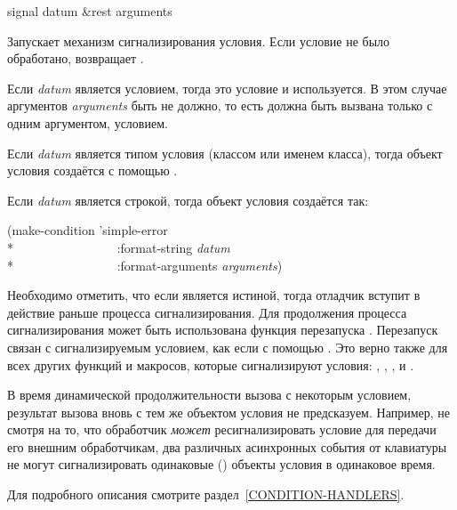 \begin{defun}[Функция]
signal datum &rest arguments

Запускает механизм сигнализирования условия. Если условие не было обработано,
 возвращает .

Если \emph{datum} является условием, тогда это условие и используется.
В этом случае аргументов \emph{arguments} быть не должно, то есть 
должна быть вызвана только с одним аргументом, условием.

Если \emph{datum} является типом условия (классом или именем класса), тогда
объект условия создаётся с помощью .

Если \emph{datum} является строкой, тогда объект условия создаётся так:
\begin{lisp}
  (make-condition 'simple-error \\*
  ~~~~~~~~~~~~~~~~:format-string \emph{datum} \\*
  ~~~~~~~~~~~~~~~~:format-arguments \emph{arguments})
\end{lisp}

Необходимо отметить, что если 
является истиной, тогда отладчик вступит в действие раньше процесса
сигнализирования. Для продолжения процесса сигнализирования может быть
использована функция перезапуска . Перезапуск связан с
сигнализируемым условием, как если с помощью .
Это верно также для всех других функций и макросов, которые сигнализируют
условия: , , ,  и
.

В время динамической продолжительности вызова  с некоторым условием,
результат вызова  вновь с тем же объектом условия не предсказуем.
Например, не смотря на то, что обработчик \emph{может} ресигнализировать условие
для передачи его внешним обработчикам, два различных асинхронных события от
клавиатуры не могут сигнализировать одинаковые () объекты условия в
одинаковое время.

Для подробного описания смотрите раздел~\ref{CONDITION-HANDLERS}.
\end{defun}


